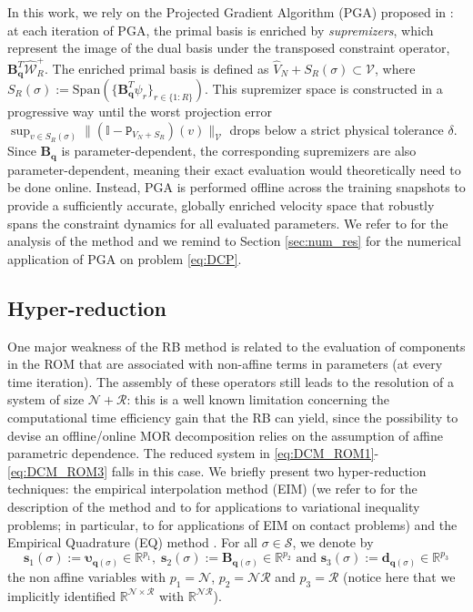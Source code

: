 In this work, we rely on the Projected Gradient Algorithm (PGA) proposed in \cite{niakh2023stable}: at each iteration of PGA,  the primal basis is enriched by \emph{supremizers}, which represent the image of the dual basis under the transposed constraint operator, $\mathbf{B}_{\mathbf{q}}^T \hat{\mathcal{W}}^+_R$. The enriched primal basis is defined as $\hat{V}_N+S_R(\sigma) \subset \mathcal{V}$, where $S_R(\sigma):=\text{Span}(\{\mathbf{B}_{\mathbf{q}}^T \psi_r\}_{r \in \{1:R\}})$.
This supremizer space is constructed in a progressive way until the worst projection error $\sup_{v \in S_{R}(\sigma)}\|(\mathbb{I}-\texttt{P}_{V_N+S_R})(v)\|_{\mathcal{V}}$ drops below a strict physical tolerance $\delta$. 
Since $\mathbf{B}_{\mathbf{q}}$ is parameter-dependent, the corresponding supremizers are also parameter-dependent, meaning their exact evaluation would theoretically need to be done online. Instead, PGA is performed offline across the training snapshots to provide a sufficiently accurate, globally enriched velocity space that robustly spans the constraint dynamics for all evaluated parameters. We refer to \cite{niakh2023stable} for the analysis of the method and we remind to Section \ref{sec:num_res} for the numerical application of PGA on problem \eqref{eq:DCP}.


\subsection{Hyper-reduction}
\label{sec:hyper}
One major weakness of the RB method is related to the evaluation of components in the ROM that are associated with non-affine terms in parameters (at every time iteration). The assembly of these operators still leads to the resolution of a system of  size $\mathcal N+\mathcal R$: this is a well known limitation concerning the computational time efficiency gain that the RB can yield, since the possibility to devise an offline/online MOR decomposition relies on the assumption of affine parametric dependence.
The reduced system in \eqref{eq:DCM_ROM1}-\eqref{eq:DCM_ROM3} falls in this case. We briefly present two hyper-reduction techniques: the empirical interpolation method (EIM) (we refer to \cite{barrault2004empirical,chaturantabut2010nonlinear} for the description of the method and to \cite{benaceur2020reduced, newsum2017efficient} for applications to variational inequality problems; in particular, to \cite{fauque2018hybrid} for applications of EIM on contact problems) and the Empirical Quadrature (EQ) method \cite{antil2013two, farhat2015structure,yano2019lp}. %
For all $\sigma \in \mathcal S$, we denote by
$$
\mathbf{s}_1(\sigma):= \boldsymbol {\upsilon}_{\mathbf{q}(\sigma)} \in \mathbb{R}^{p_1}, \; \mathbf{s}_2(\sigma):= \mathbf{B}_{\mathbf{q}(\sigma)} \in \mathbb{R}^{p_2} \mbox{ and } \mathbf{s}_3(\sigma):= \mathbf{d}_{\mathbf{q}(\sigma)} \in \mathbb{R}^{p_3} 
$$
the non affine variables with $p_1 = \mathcal{N}$, $p_2 = \mathcal{N}\mathcal{R} $ and $p_3 = \mathcal{R}$ (notice here that we implicitly identified $\mathbb{R}^{ \mathcal{N}\times \mathcal{R}}$ with $\mathbb{R}^{ \mathcal{N}\mathcal{R}}$). 
